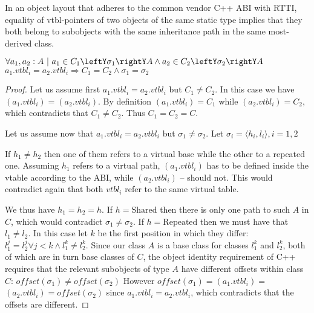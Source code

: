 \begin{theorem}
In an object layout that adheres to the common vendor C++ ABI with 
RTTI, equality of vtbl-pointers of two objects of the same 
static type implies that they both belong to subobjects with the same 
inheritance path in the same most-derived class.

\noindent
$\forall a_1, a_2 : A\ |\ a_1\in C_1\leftY\sigma_1\rightY A \wedge a_2\in C_2\leftY\sigma_2\rightY A $ \\ 
$a_1.\textit{vtbl}_i = a_2.\textit{vtbl}_i \Rightarrow C_1 = C_2 \wedge \sigma_1 = \sigma_2$
\label{thm:vtbl}
\end{theorem}
\begin{proof}
Let us assume first $a_1.\textit{vtbl}_i = a_2.\textit{vtbl}_i$ but $C_1 \neq C_2$. In this case we 
have $(a_1.\textit{vtbl}_i) = $$(a_2.\textit{vtbl}_i)$. By definition 
$(a_1.\textit{vtbl}_i) = C_1$ while $(a_2.\textit{vtbl}_i) = C_2$, which 
contradicts that $C_1 \neq C_2$. Thus $C_1 = C_2 = C$.

Let us assume now that $a_1.\textit{vtbl}_i = a_2.\textit{vtbl}_i$ but $\sigma_1 \neq \sigma_2$. 
Let $\sigma_i=\langle h_i,l_i\rangle,i=1,2$ 

If $h_1 \neq h_2$ then one of them refers to a virtual base while the other to a 
repeated one. Assuming $h_1$ refers to a virtual path, $(a_1.\textit{vtbl}_i)$ 
has to be defined inside the vtable according to the ABI, while 
$(a_2.\textit{vtbl}_i)$ -- should not. This would contradict again that both 
$vtbl_i$ refer to the same virtual table.

We thus have $h_1 = h_2 = h$. If $h = \mathrm{Shared}$ then there is only one path to 
such $A$ in $C$, which would contradict $\sigma_1 \neq \sigma_2$. 
If $h = \mathrm{Repeated}$ then we must have that $l_1 \neq l_2$. In this case let $k$ be 
the first position in which they differ: 
$l_1^j=l_2^j \forall j<k \wedge l_1^k\neq l_2^k$. Since our class $A$ is a base 
class for classes $l_1^k$ and $l_2^k$, both of which are in turn base classes of 
$C$, the object identity requirement of C++ requires that the relevant subobjects 
of type $A$ have different offsets within class $C$: 
$\mathit{offset}(\sigma_1)\neq \mathit{offset}(\sigma_2)$ However 
$\mathit{offset}(\sigma_1)=$$(a_1.\textit{vtbl}_i)=$$(a_2.\textit{vtbl}_i)=\mathit{offset}(\sigma_2)$ 
since $a_1.\textit{vtbl}_i = a_2.\textit{vtbl}_i$, which contradicts that the offsets are different.
\end{proof}

